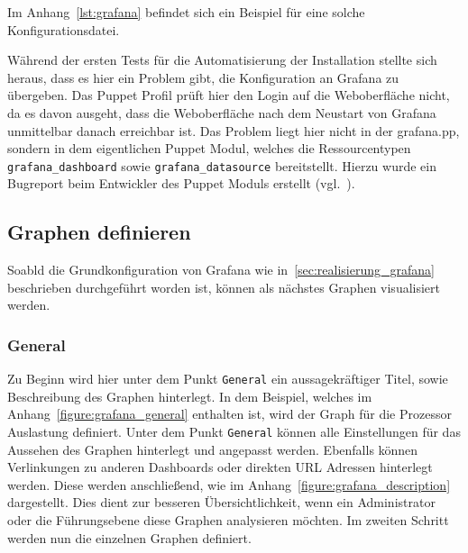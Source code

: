 Im Anhang~\ref{lst:grafana} befindet sich ein Beispiel für eine solche
Konfigurationsdatei.

Während der ersten Tests für die Automatisierung der Installation stellte sich
heraus, dass es hier ein Problem gibt, die Konfiguration an Grafana zu
übergeben. Das Puppet Profil prüft hier den Login auf die Weboberfläche nicht,
da es davon ausgeht, dass die Weboberfläche nach dem Neustart von Grafana
unmittelbar danach erreichbar ist. Das Problem liegt hier nicht in der
grafana.pp, sondern in dem eigentlichen Puppet Modul, welches die
Ressourcentypen \texttt{grafana\_dashboard} sowie \texttt{grafana\_datasource}
bereitstellt. Hierzu wurde ein Bugreport beim Entwickler des Puppet Moduls
erstellt (vgl.~\cite{grafana-issue}).
\mr%

\subsection{Graphen definieren}
\label{subsec:graphen-definieren}
Soabld die Grundkonfiguration von Grafana wie in~\ref{sec:realisierung_grafana}
beschrieben durchgeführt worden ist, können als nächstes Graphen visualisiert
werden.
\mr%

\subsubsection{General}
Zu Beginn wird hier unter dem Punkt \texttt{General} ein
aussagekräftiger Titel, sowie Beschreibung des Graphen hinterlegt. In dem
Beispiel, welches im Anhang~\ref{figure:grafana_general} enthalten ist, wird
der Graph für die Prozessor Auslastung definiert. Unter dem Punkt
\texttt{General} können alle Einstellungen für das Aussehen des Graphen
hinterlegt und angepasst werden. Ebenfalls können Verlinkungen zu anderen
Dashboards oder direkten URL Adressen hinterlegt werden. Diese werden
anschließend, wie im Anhang~\ref{figure:grafana_description} dargestellt. Dies
dient zur besseren Übersichtlichkeit, wenn ein Administrator oder die
Führungsebene diese Graphen analysieren möchten. Im zweiten Schritt werden nun
die einzelnen Graphen definiert.
\mr%

